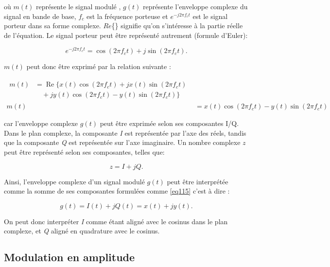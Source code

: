 où $m(t)$ représente le signal modulé , $g(t)$ représente l'enveloppe complexe du signal en bande de base, $f_c$ est la fréquence porteuse et $e^{-j2\pi f_c t}$ est le signal porteur dans sa forme complexe. $Re$\{\} signifie qu'on s'intéresse à la partie réelle de l'équation. Le signal porteur peut être représenté autrement (formule d'Euler):

\begin{equation}\label{eq111}
e^{-j2\pi f_c t} = \cos(2 \pi f_c t) + j \sin(2 \pi f_c t).
\end{equation}

$m(t)$ peut donc être exprimé par la relation suivante :

\begin{align}
    \begin{split}
    m(t) &= \operatorname{Re} \{ x(t) \cos(2 \pi f_c t) + j x(t) \sin(2 \pi f_c t) \\
         &\quad + j y(t) \cos(2 \pi f_c t) - y(t) \sin(2 \pi f_c t)\}
    \end{split} \\
    m(t) &= x(t) \cos(2 \pi f_c t) - y(t) \sin(2 \pi f_c t)
\end{align}

car l'enveloppe complexe $g(t)$ peut être exprimée selon ses composantes \ac{I/Q}. Dans le plan complexe, la composante \textit{I} est représentée par l'axe des réels, tandis que la composante \textit{Q} est représentée sur l'axe imaginaire. Un nombre complexe $z$ peut être représenté selon ses composantes, telles que:

\begin{equation}\label{eq115}
z = I + jQ.
\end{equation}

Ainsi, l'enveloppe complexe d'un signal modulé $g(t)$ peut être interprétée comme la somme de ses composantes formulées comme \ref{eq115} c'est à dire :

\begin{equation}\label{eq116}
g(t) = I(t) + jQ(t) = x(t) + jy(t).
\end{equation}

On peut donc interpréter \textit{I} comme étant aligné avec le cosinus dans le plan complexe, et \textit{Q} aligné en quadrature avec le cosinus.

\subsection{Modulation en amplitude}

